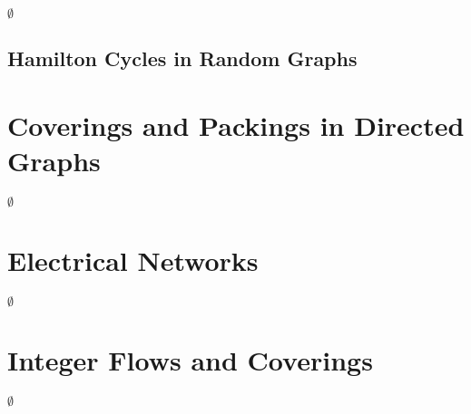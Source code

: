 \documentclass[12pt]{article}
\begin{document}
$\emptyset$

\subsection{Hamilton Cycles in Random Graphs}



\newpage

\section{Coverings and Packings in Directed Graphs}


$\emptyset$

\section{Electrical Networks}


$\emptyset$

\section{Integer Flows and Coverings}


$\emptyset$
\end{document}
